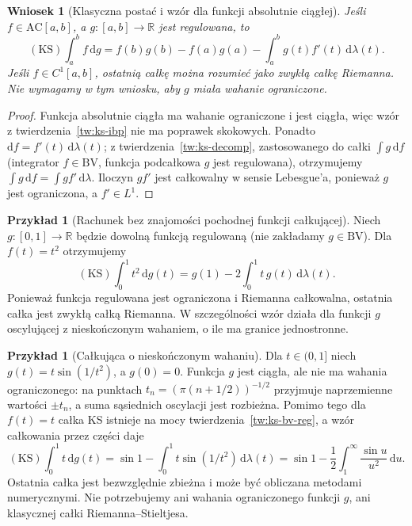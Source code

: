 \documentclass[11pt,a4paper]{article}
\numberwithin{equation}{section}
\theoremstyle{plain}
\newtheorem{wniosek}[twierdzenie]{Wniosek}
\theoremstyle{definition}
\newtheorem{przyklad}[twierdzenie]{Przykład}
\theoremstyle{remark}
\newcommand{\R}{\mathbb R}
\newcommand{\AC}{\mathrm{AC}}
\newcommand{\BV}{\mathrm{BV}}
\newcommand{\KS}{\mathrm{KS}}
\begin{document}
\begin{wniosek}[Klasyczna postać i wzór dla funkcji absolutnie ciągłej]
\label{wn:ks-ibp-ac}
Jeśli $f\in\AC[a,b]$, a $g:[a,b]\to\R$ jest regulowana, to
\[
 (\KS)\int_a^b f\,\mathrm dg
 =f(b)g(b)-f(a)g(a)-\int_a^b g(t)f'(t)\,\mathrm d\lambda(t).
\]
Jeśli $f\in C^1[a,b]$, ostatnią całkę można rozumieć jako zwykłą całkę Riemanna. Nie wymagamy w tym wniosku, aby $g$ miała wahanie ograniczone.
\end{wniosek}
\begin{proof}
Funkcja absolutnie ciągła ma wahanie ograniczone i jest ciągła, więc wzór z twierdzenia~\ref{tw:ks-ibp} nie ma poprawek skokowych. Ponadto $\mathrm df=f'(t)\,\mathrm d\lambda(t)$; z twierdzenia~\ref{tw:ks-decomp}, zastosowanego do całki $\int g\,\mathrm df$ (integrator $f\in\BV$, funkcja podcałkowa $g$ jest regulowana), otrzymujemy $\int g\,\mathrm df=\int gf'\,\mathrm d\lambda$. Iloczyn $gf'$ jest całkowalny w sensie Lebesgue'a, ponieważ $g$ jest ograniczona, a $f'\in L^1$.
\end{proof}

\begin{przyklad}[Rachunek bez znajomości pochodnej funkcji całkującej]
Niech $g:[0,1]\to\R$ będzie dowolną funkcją regulowaną (nie zakładamy $g\in\BV$). Dla $f(t)=t^2$ otrzymujemy
\[
 (\KS)\int_0^1 t^2\,\mathrm dg(t)=g(1)-2\int_0^1 t\,g(t)\,\mathrm d\lambda(t).
\]
Ponieważ funkcja regulowana jest ograniczona i Riemanna całkowalna, ostatnia całka jest zwykłą całką Riemanna. W szczególności wzór działa dla funkcji $g$ oscylującej z nieskończonym wahaniem, o ile ma granice jednostronne.
\end{przyklad}

\begin{przyklad}[Całkująca o nieskończonym wahaniu]
Dla $t\in(0,1]$ niech $g(t)=t\sin(1/t^2)$, a $g(0)=0$. Funkcja $g$ jest ciągła, ale nie ma wahania ograniczonego: na punktach $t_n=(\pi(n+1/2))^{-1/2}$ przyjmuje naprzemienne wartości $\pm t_n$, a suma sąsiednich oscylacji jest rozbieżna. Pomimo tego dla $f(t)=t$ całka KS istnieje na mocy twierdzenia~\ref{tw:ks-bv-reg}, a wzór całkowania przez części daje
\[
 (\KS)\int_0^1 t\,\mathrm dg(t)
 =\sin1-\int_0^1 t\sin(1/t^2)\,\mathrm d\lambda(t)
 =\sin1-\frac12\int_1^\infty\frac{\sin u}{u^2}\,\mathrm du.
\]
Ostatnia całka jest bezwzględnie zbieżna i może być obliczana metodami numerycznymi. Nie potrzebujemy ani wahania ograniczonego funkcji $g$, ani klasycznej całki Riemanna--Stieltjesa.
\end{przyklad}
\end{document}
